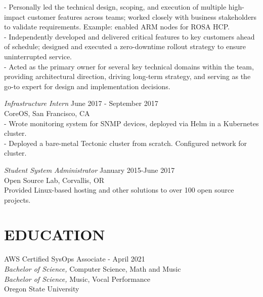 \documentclass[line,margin]{res}
\begin{document}
\begin{resume}
                    - Personally led the technical design, scoping, and execution of multiple high-impact customer features across teams; worked closely with business stakeholders to validate requirements. Example: enabled ARM nodes for ROSA HCP. \\
                    - Independently developed and delivered critical features to key customers ahead of schedule; designed and executed a zero-downtime rollout strategy to ensure uninterrupted service. \\
                    - Acted as the primary owner for several key technical domains within the team, providing architectural direction, driving long-term strategy, and serving as the go-to expert for design and implementation decisions.

                    {\sl Infrastructure Intern} \hfill June 2017 - September 2017\\
                    CoreOS,
                    San Francisco, CA\\
                    - Wrote monitoring system for SNMP devices, deployed via Helm in a Kubernetes cluster.\\
                    - Deployed a bare-metal Tectonic cluster from scratch. Configured network for cluster.

                    {\sl Student System Administrator} \hfill January 2015-June 2017\\
                    Open Source Lab, 
                    Corvallis, OR\\
                    Provided Linux-based hosting and other solutions to over 100 open source projects.

\section{EDUCATION}
                    AWS Certified SysOps Associate - April 2021 \\
                    {\sl Bachelor of Science,} Computer Science, Math and Music \\
                    {\sl Bachelor of Science,} Music, Vocal Performance \\
                    Oregon State University\\
                   
\end{resume}
\end{document}
